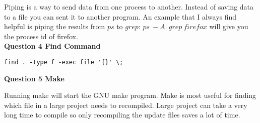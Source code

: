 \documentclass[10pt,a4paper]{article}
\begin{document}
Piping is a way to send data from one process to another.  Instead of saving data to a file you can sent it to another program.  An example that I always find helpful is piping the results from $ps$ to $grep$: $ps\ -A |\ grep\ firefox$ will give you the process id of firefox. \\

\textbf{Question 4 Find Command}
\begin{verbatim}
find . -type f -exec file '{}' \;
\end{verbatim}

\textbf{Question 5 Make}

Running make will start the GNU make program.  Make is most useful for finding which file in a large project needs to recompiled.  Large project can take a very long time to compile so only recompiling the update files saves a lot of time.\\
 
\end{document}

